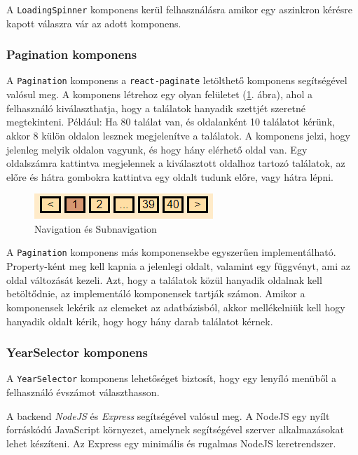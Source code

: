 A \texttt{LoadingSpinner} komponens kerül felhasználásra amikor egy aszinkron kérésre kapott válaszra vár az adott komponens.

\subsubsection{Pagination komponens}

A \texttt{Pagination} komponens a \texttt{react-paginate} letölthető komponens segítségével valósul meg. A komponens létrehoz egy olyan felületet (\ref{fig:pagination}. ábra), ahol a felhasználó kiválaszthatja, hogy a találatok hanyadik szettjét szeretné megtekinteni. Például: Ha 80 találat van, és oldalanként 10 találatot kérünk, akkor 8 külön oldalon lesznek megjelenítve a találatok. A komponens jelzi, hogy jelenleg melyik oldalon vagyunk, és hogy hány elérhető oldal van. Egy oldalszámra kattintva megjelennek a kiválasztott oldalhoz tartozó találatok, az előre és hátra gombokra kattintva egy oldalt tudunk előre, vagy hátra lépni.

\begin{figure}[h]
\centering
\includegraphics[scale=1]{images/application/pagination.png}
\caption{Navigation és Subnavigation}
\label{fig:pagination}
\end{figure}

A \texttt{Pagination} komponens más komponensekbe egyszerűen implementálható. Pro\-per\-ty-ként meg kell kapnia a jelenlegi oldalt, valamint egy függvényt, ami az oldal változását kezeli. Azt, hogy a találatok közül hanyadik oldalnak kell betöltődnie, az implementáló komponensek tartják számon. Amikor a komponensek lekérik az elemeket az adatbázisból, akkor mellékelniük kell hogy hanyadik oldalt kérik, hogy hogy hány darab találatot kérnek.

\subsubsection{YearSelector komponens}

A \texttt{YearSelector} komponens lehetőséget biztosít, hogy egy lenyíló menüből a felhasználó évszámot választhasson.

A backend \textit{NodeJS} és \textit{Express} segítségével valósul meg. A NodeJS egy nyílt forráskódú JavaScript környezet, amelynek segítségével szerver alkalmazásokat lehet készíteni. Az Express egy minimális és rugalmas NodeJS keretrendszer.

